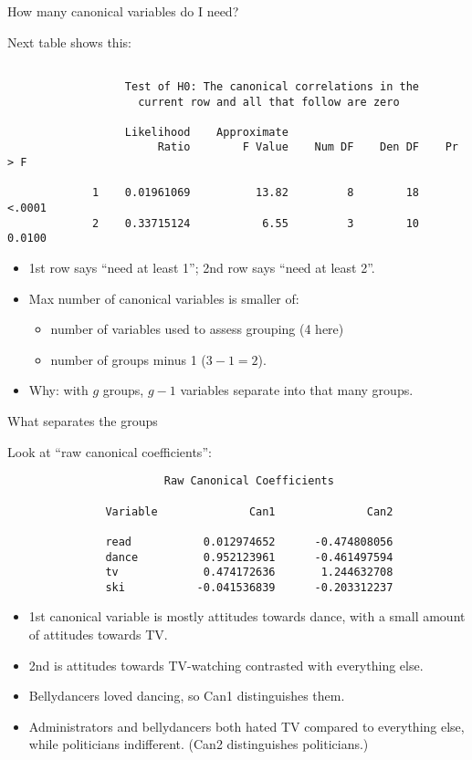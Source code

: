 \documentclass[pdf]{prosper}
\begin{document}
\begin{slide}{How many canonical variables do I need?}

Next table shows this:

{\scriptsize
\begin{verbatim}

                  Test of H0: The canonical correlations in the
                    current row and all that follow are zero

                  Likelihood    Approximate
                       Ratio        F Value    Num DF    Den DF    Pr > F

             1    0.01961069          13.82         8        18    <.0001
             2    0.33715124           6.55         3        10    0.0100

\end{verbatim}
}
\begin{itemize}
\item 
1st row says ``need at least 1''; 2nd row says ``need at least 2''.
\item Max number of canonical variables is smaller of:
  \begin{itemize}
  \item number of variables used to assess grouping (4 here)
  \item number of groups minus 1 ($3-1=2$).
  \end{itemize}
\item Why: with $g$ groups, $g-1$ variables separate into that many groups.
\end{itemize}
  
\end{slide}

\begin{slide}{What separates the groups}

Look at ``raw canonical coefficients'':

{\scriptsize
\begin{verbatim}
                        Raw Canonical Coefficients
 
               Variable              Can1              Can2

               read           0.012974652      -0.474808056
               dance          0.952123961      -0.461497594
               tv             0.474172636       1.244632708
               ski           -0.041536839      -0.203312237

\end{verbatim}
}

\begin{itemize}
\item 1st canonical variable is mostly attitudes towards dance, with a small amount of attitudes towards TV.
\item 2nd is attitudes towards TV-watching contrasted with everything else.
\item Bellydancers loved dancing, so Can1 distinguishes them.
\item Administrators and bellydancers both hated TV compared to everything else, while politicians indifferent. (Can2 distinguishes politicians.)
\end{itemize}
  
\end{slide}
\end{document}
